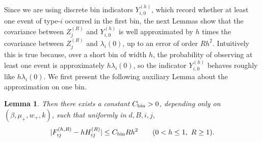 \documentclass{article}
\newtheorem{lemma}{Lemma}[section]
\newcommand{\abs}[1]{\lvert #1\rvert}
\begin{document}
Since we are using discrete bin indicators $Y_{i,0}^{(h)}$, which record whether at least one event of type-$i$ occurred in the first bin, the next Lemmas show that the covariance between $Z_j^{(R)}$ and $Y_{i,0}^{(h)}$ is well approximated by $h$ times the covariance between $Z_j^{(R)}$ and $\lambda_i(0)$, up to an error of order $Rh^2$. Intuitively this is true because, over a short bin of width $h$, the probability of observing at least one event is approximately $h\lambda_i(0)$, so the indicator $Y_{i,0}^{(h)}$ behaves roughly like $h\lambda_i(0)$. We first present the following auxiliary Lemma about the approximation on one bin.
\begin{lemma}
\label{lem:one-bin-expansion}
Then there exists a constant $C_{\rm bin}>0$, depending only on $(\beta,\mu_+,w_+,k)$, such that uniformly in $d,B,i,j$,
\begin{equation}
\label{eq:one-bin-expansion}
\abs{F_{ij}^{(h,R)} - h H_{ij}^{(R)}}
\le C_{\rm bin} R h^2
\qquad (0<h\le 1,\ R\ge 1).
\end{equation}
\end{lemma}
\end{document}
